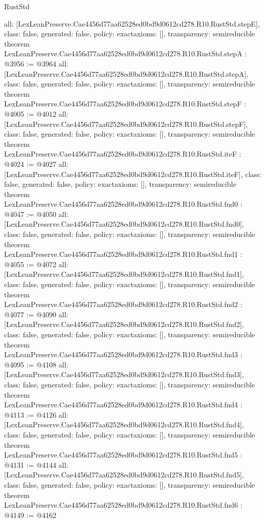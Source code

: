 \begin{lexlean}{RustStd}
\begin{coremodule}
{  all: [LexLeanPreserve.Cae4456d77aa62528ed0bd9d0612cd278.R10.RustStd.stepE],
  class: false,
  generated: false,
  policy: exact{axioms: []},
  transparency: semireducible
}
theorem LexLeanPreserve.Cae4456d77aa62528ed0bd9d0612cd278.R10.RustStd.stepA : @3956 := @3964 {
  all: [LexLeanPreserve.Cae4456d77aa62528ed0bd9d0612cd278.R10.RustStd.stepA],
  class: false,
  generated: false,
  policy: exact{axioms: []},
  transparency: semireducible
}
theorem LexLeanPreserve.Cae4456d77aa62528ed0bd9d0612cd278.R10.RustStd.stepF : @4005 := @4012 {
  all: [LexLeanPreserve.Cae4456d77aa62528ed0bd9d0612cd278.R10.RustStd.stepF],
  class: false,
  generated: false,
  policy: exact{axioms: []},
  transparency: semireducible
}
theorem LexLeanPreserve.Cae4456d77aa62528ed0bd9d0612cd278.R10.RustStd.iteF : @4024 := @4027 {
  all: [LexLeanPreserve.Cae4456d77aa62528ed0bd9d0612cd278.R10.RustStd.iteF],
  class: false,
  generated: false,
  policy: exact{axioms: []},
  transparency: semireducible
}
theorem LexLeanPreserve.Cae4456d77aa62528ed0bd9d0612cd278.R10.RustStd.fnd0 : @4047 := @4050 {
  all: [LexLeanPreserve.Cae4456d77aa62528ed0bd9d0612cd278.R10.RustStd.fnd0],
  class: false,
  generated: false,
  policy: exact{axioms: []},
  transparency: semireducible
}
theorem LexLeanPreserve.Cae4456d77aa62528ed0bd9d0612cd278.R10.RustStd.fnd1 : @4055 := @4072 {
  all: [LexLeanPreserve.Cae4456d77aa62528ed0bd9d0612cd278.R10.RustStd.fnd1],
  class: false,
  generated: false,
  policy: exact{axioms: []},
  transparency: semireducible
}
theorem LexLeanPreserve.Cae4456d77aa62528ed0bd9d0612cd278.R10.RustStd.fnd2 : @4077 := @4090 {
  all: [LexLeanPreserve.Cae4456d77aa62528ed0bd9d0612cd278.R10.RustStd.fnd2],
  class: false,
  generated: false,
  policy: exact{axioms: []},
  transparency: semireducible
}
theorem LexLeanPreserve.Cae4456d77aa62528ed0bd9d0612cd278.R10.RustStd.fnd3 : @4095 := @4108 {
  all: [LexLeanPreserve.Cae4456d77aa62528ed0bd9d0612cd278.R10.RustStd.fnd3],
  class: false,
  generated: false,
  policy: exact{axioms: []},
  transparency: semireducible
}
theorem LexLeanPreserve.Cae4456d77aa62528ed0bd9d0612cd278.R10.RustStd.fnd4 : @4113 := @4126 {
  all: [LexLeanPreserve.Cae4456d77aa62528ed0bd9d0612cd278.R10.RustStd.fnd4],
  class: false,
  generated: false,
  policy: exact{axioms: []},
  transparency: semireducible
}
theorem LexLeanPreserve.Cae4456d77aa62528ed0bd9d0612cd278.R10.RustStd.fnd5 : @4131 := @4144 {
  all: [LexLeanPreserve.Cae4456d77aa62528ed0bd9d0612cd278.R10.RustStd.fnd5],
  class: false,
  generated: false,
  policy: exact{axioms: []},
  transparency: semireducible
}
theorem LexLeanPreserve.Cae4456d77aa62528ed0bd9d0612cd278.R10.RustStd.fnd6 : @4149 := @4162 {
}
\end{coremodule}
\end{lexlean}
